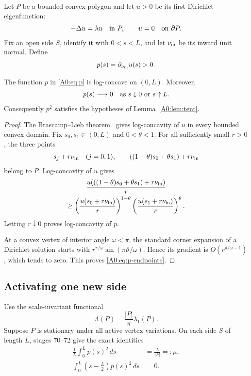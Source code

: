 Let \(P\) be a bounded convex polygon and let \(u>0\) be its first
Dirichlet eigenfunction:
\begin{equation}
 -\Delta u=\lambda u\quad\hbox{in }P,\qquad
 u=0\quad\hbox{on }\partial P.
\end{equation}
Fix an open side \(S\), identify it with \(0<s<L\), and let
\(\nu_{\rm in}\) be its inward unit normal.  Define
\begin{equation}\label{A0:eq:p}
 p(s)=\partial_{\nu_{\rm in}}u(s)>0.
\end{equation}

\begin{lemma}
\label{A0:lem:flux-logconcave}
The function \(p\) in \eqref{A0:eq:p} is log-concave on \((0,L)\).
Moreover,
\begin{equation}\label{A0:eq:p-endpoints}
 p(s)\longrightarrow0
 \quad\hbox{as }s\downarrow0\hbox{ or }s\uparrow L.
\end{equation}
Consequently \(p^2\) satisfies the hypotheses of
Lemma~\ref{A0:lem:tent}.
\end{lemma}

\begin{proof}
The Brascamp--Lieb theorem~\cite{BL76} gives log-concavity of \(u\) in every bounded
convex domain.  Fix \(s_0,s_1\in(0,L)\) and \(0<\theta<1\).  For all
sufficiently small \(r>0\), the three points
\[
 s_j+r\nu_{\rm in}\quad(j=0,1),\qquad
 ((1-\theta)s_0+\theta s_1)+r\nu_{\rm in}
\]
belong to \(P\).  Log-concavity of \(u\) gives
\begin{multline}
 \frac{u(((1-\theta)s_0+\theta s_1)+r\nu_{\rm in})}{r}\\
 \ge
 \left(\frac{u(s_0+r\nu_{\rm in})}{r}\right)^{1-\theta}
 \left(\frac{u(s_1+r\nu_{\rm in})}{r}\right)^\theta.
\end{multline}
Letting \(r\downarrow0\) proves log-concavity of \(p\).

At a convex vertex of interior angle \(\omega<\pi\), the standard corner
expansion of a Dirichlet solution starts with
\(r^{\pi/\omega}\sin(\pi\vartheta/\omega)\).  Hence its gradient is
\(O(r^{\pi/\omega-1})\), which tends to zero.  This proves
\eqref{A0:eq:p-endpoints}.
\end{proof}

\subsection{Activating one new side}

Use the scale-invariant functional
\begin{equation}\label{A0:eq:Lambda}
 \Lambda(P)=\frac{|P|}{\pi}\lambda_1(P).
\end{equation}
Suppose \(P\) is stationary under all active vertex variations.  On each
side \(S\) of length \(L\), stages 70--72 give the exact identities
\begin{align}
 \frac1L\int_0^Lp(s)^2\,ds&=\frac{\lambda}{|P|}=:\mu,
 \label{A0:eq:mean}\\
 \int_0^L\left(s-\frac L2\right)p(s)^2\,ds&=0.
 \label{A0:eq:first-moment}
\end{align}

